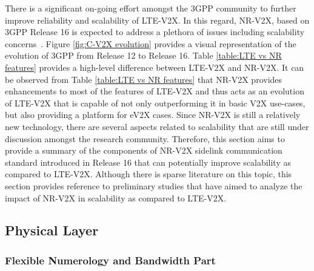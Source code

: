 \documentclass[iicol]{sn-jnl}%
\theoremstyle{thmstyleone}%
\theoremstyle{thmstyletwo}%
\theoremstyle{thmstylethree}%
\begin{document}
There is a significant on-going effort amongst the 3GPP community to further improve reliability and scalability of LTE-V2X. In this regard, NR-V2X, based on 3GPP Release 16 \cite{NR:phy} is expected to address a plethora of issues including scalability concerns~\cite{garcia2021tutorial, bazzi2021design}. 
Figure \ref{fig:C-V2X evolution} provides a visual representation of the evolution of 3GPP from Release 12 to Release 16.
Table \ref{table:LTE vs NR features} provides a high-level difference between LTE-V2X and NR-V2X.
It can be observed from Table \mbox{\ref{table:LTE vs NR features}} that NR-V2X provides enhancements to most of the features of LTE-V2X and thus acts as an evolution of LTE-V2X that is capable of not only outperforming it in basic V2X use-cases, but also providing a platform for eV2X cases. Since NR-V2X is still a relatively new technology, there are several aspects related to scalability that are still under discussion amongst the research community. Therefore, this section aims to provide a summary of the components of NR-V2X sidelink communication standard introduced in Release 16 that can potentially improve scalability as compared to LTE-V2X. Although there is sparse literature on this topic, this section provides reference to preliminary studies that have aimed to analyze the impact of NR-V2X in scalability as compared to LTE-V2X.

\subsection{Physical Layer}\label{subsec7.1}

\subsubsection{Flexible Numerology and Bandwidth Part}\label{subsec7.1.1}
\end{document}
